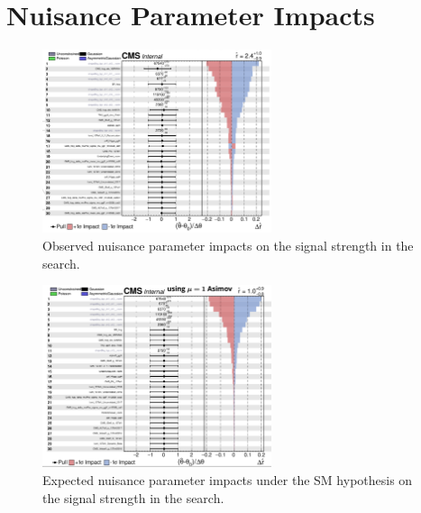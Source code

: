 \chapter{Nuisance Parameter Impacts}\label{sec:appendix_impacts}

\begin{figure}[htb]
  \centering
   \includegraphics[width=0.6\textwidth]{fig/impacts/observed_impacts.png}
	\caption{Observed nuisance parameter impacts on the signal strength in the \hzg{} search.}
\end{figure}

\begin{figure}[htb]
  \centering
   \includegraphics[width=0.6\textwidth]{fig/impacts/expected_impacts.png}
	\caption{Expected nuisance parameter impacts under the SM hypothesis on the signal strength in the \hzg{} search.}
\end{figure}

